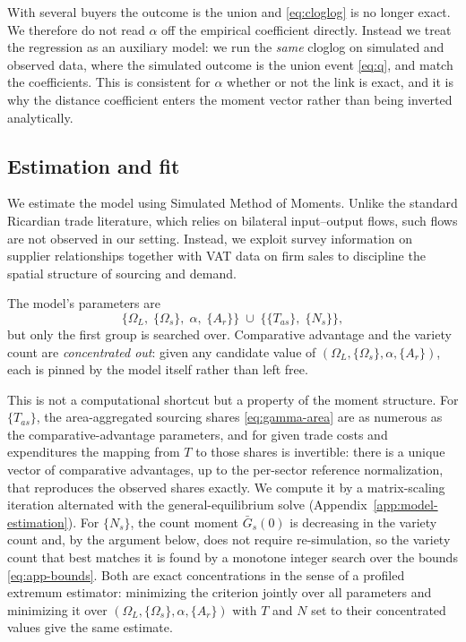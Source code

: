 With several buyers the outcome is the union and \eqref{eq:cloglog} is no longer exact. We
therefore do not read $\alpha$ off the empirical coefficient directly. Instead we treat the
regression as an auxiliary model: we run the \emph{same} cloglog on simulated and observed
data, where the simulated outcome is the union event \eqref{eq:q}, and match the coefficients.
This is consistent for $\alpha$ whether or not the link is exact, and it is why the distance
coefficient enters the moment vector rather than being inverted analytically.

\subsection{Estimation and fit}
\label{sec:model-estimation}

We estimate the model using Simulated Method of Moments. Unlike the standard Ricardian trade
literature, which relies on bilateral input--output flows, such flows are not observed in our
setting. Instead, we exploit survey information on supplier relationships together with VAT
data on firm sales to discipline the spatial structure of sourcing and demand.

The model's parameters are
\begin{equation}
\big\{\Omega_{L},\;\{\Omega_{s}\},\;\alpha,\;\{A_{r}\}\big\}
\;\cup\;\big\{\{T_{as}\},\;\{N_{s}\}\big\},
\end{equation}
but only the first group is searched over. Comparative advantage and the variety count are
\emph{concentrated out}: given any candidate value of $(\Omega_{L},\{\Omega_{s}\},\alpha,\{A_{r}\})$,
each is pinned by the model itself rather than left free.

This is not a computational shortcut but a property of the moment structure. For $\{T_{as}\}$,
the area-aggregated sourcing shares \eqref{eq:gamma-area} are as numerous as the comparative-advantage
parameters, and for given trade costs and expenditures the mapping from $T$ to those shares is
invertible: there is a unique vector of comparative advantages, up to the per-sector reference
normalization, that reproduces the observed shares exactly. We compute it by a matrix-scaling
iteration alternated with the general-equilibrium solve
(Appendix~\ref{app:model-estimation}). For $\{N_{s}\}$, the count moment $\bar G_{s}(0)$ is
decreasing in the variety count and, by the argument below, does not require re-simulation, so
the variety count that best matches it is found by a monotone integer search over the bounds
\eqref{eq:app-bounds}. Both are exact concentrations in the sense of a profiled extremum
estimator: minimizing the criterion jointly over all parameters and minimizing it over
$(\Omega_{L},\{\Omega_{s}\},\alpha,\{A_{r}\})$ with $T$ and $N$ set to their concentrated values
give the same estimate.

